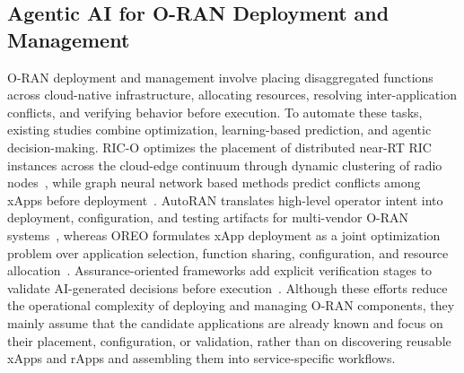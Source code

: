 \documentclass[conference]{IEEEtran}
\begin{document}
\subsection{Agentic AI for O-RAN Deployment and Management}
O-RAN deployment and management involve placing disaggregated functions across cloud-native infrastructure, allocating resources, resolving inter-application conflicts, and verifying behavior before execution. To automate these tasks, existing studies combine optimization, learning-based prediction, and agentic decision-making. RIC-O optimizes the placement of distributed near-RT RIC instances across the cloud-edge continuum through dynamic clustering of radio nodes~\cite{almeida2023ric}, while graph neural network based methods predict conflicts among xApps before deployment~\cite{al2026ran}. AutoRAN translates high-level operator intent into deployment, configuration, and testing artifacts for multi-vendor O-RAN systems~\cite{maxenti2026autoran}, whereas OREO formulates xApp deployment as a joint optimization problem over application selection, function sharing, configuration, and resource allocation~\cite{mungari2025ran}. Assurance-oriented frameworks add explicit verification stages to validate AI-generated decisions before execution~\cite{singh2025agentic}. Although these efforts reduce the operational complexity of deploying and managing O-RAN components, they mainly assume that the candidate applications are already known and focus on their placement, configuration, or validation, rather than on discovering reusable xApps and rApps and assembling them into service-specific workflows.
\end{document}
